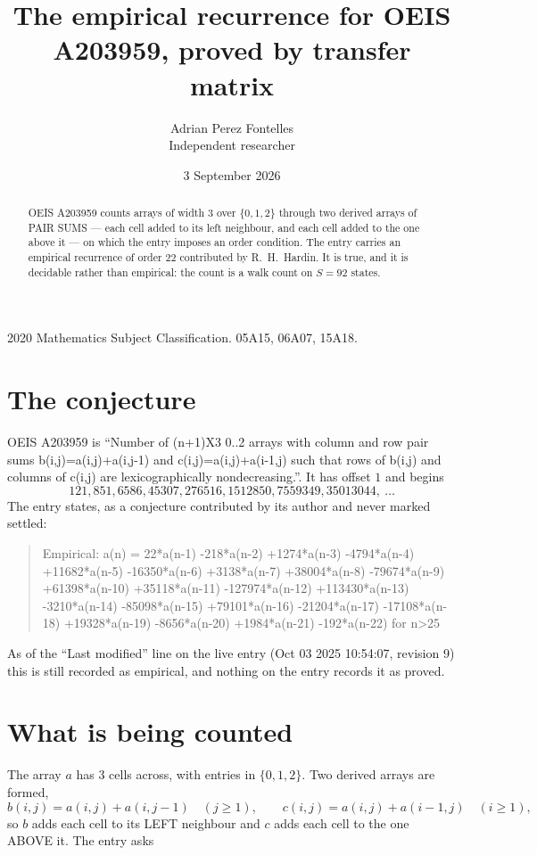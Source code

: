 \documentclass[11pt,a4paper]{article}
\title{The empirical recurrence for OEIS A203959, proved by transfer matrix}
\author{Adrian Perez Fontelles\\ \small Independent researcher}
\date{3 September 2026}
\theoremstyle{plain}
\theoremstyle{definition}
\begin{document}
\maketitle

\begin{abstract}
OEIS A203959 counts arrays of width $3$ over $\{0,1,2\}$ through two derived arrays of PAIR SUMS ---
each cell added to its left neighbour, and each cell added to the one above it --- on which the
entry imposes an order condition. The entry carries an empirical recurrence of order $22$
contributed by R.~H.~Hardin. It is true, and it is decidable rather than empirical: the count is
a walk count on $S=92$ states.
\end{abstract}

\noindent\small 2020 Mathematics Subject Classification. 05A15, 06A07, 15A18.\normalsize

\section{The conjecture}

OEIS A203959 is ``Number of (n+1)X3 0..2 arrays with column and row pair sums b(i,j)=a(i,j)+a(i,j-1) and c(i,j)=a(i,j)+a(i-1,j) such that rows of b(i,j) and columns of c(i,j) are lexicographically nondecreasing.''. It has offset $1$ and begins
\[
121, 851, 6586, 45307, 276516, 1512850, 7559349, 35013044,\ \dots
\]
The entry states, as a conjecture contributed by its author and never marked settled:
\begin{quote}
Empirical: a(n) = 22*a(n-1) -218*a(n-2) +1274*a(n-3) -4794*a(n-4) +11682*a(n-5) -16350*a(n-6) +3138*a(n-7) +38004*a(n-8) -79674*a(n-9) +61398*a(n-10) +35118*a(n-11) -127974*a(n-12) +113430*a(n-13) -3210*a(n-14) -85098*a(n-15) +79101*a(n-16) -21204*a(n-17) -17108*a(n-18) +19328*a(n-19) -8656*a(n-20) +1984*a(n-21) -192*a(n-22) for n>25
\end{quote}
As of the ``Last modified'' line on the live entry (Oct 03 2025 10:54:07, revision 9) this is still
recorded as empirical, and nothing on the entry records it as proved.

\section{What is being counted}

The array $a$ has $3$ cells across, with entries in $\{0,1,2\}$. Two derived arrays are formed,
\[
b(i,j)=a(i,j)+a(i,j-1)\quad(j\ge1),\qquad c(i,j)=a(i,j)+a(i-1,j)\quad(i\ge1),
\]
so $b$ adds each cell to its LEFT neighbour and $c$ adds each cell to the one ABOVE it. The
entry asks
\end{document}
